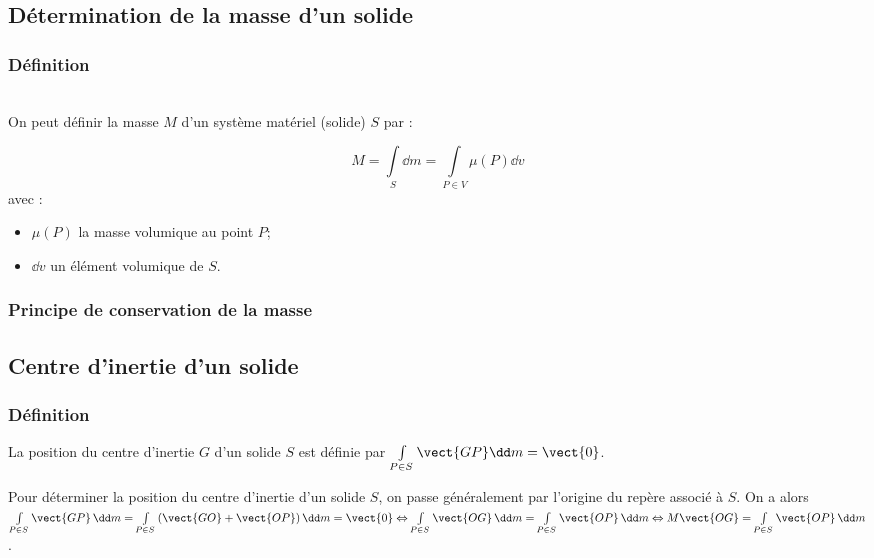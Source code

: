 \subsection{Détermination de la masse d'un solide}
\subsubsection{Définition}
\begin{defi}~\\
%
On peut définir la masse $M$ d'un système matériel (solide) $S$ par : 
\begin{multicols}{2}
\vspace{-1cm}
$$ M = \int\limits_S \dd m =\int\limits_{P\in V} \mu(P) \dd v $$ 
avec :
\begin{itemize}
\item $\mu(P)$ la masse volumique au point $P$;
\item $\dd v$ un élément volumique de $S$.
\end{itemize}
\end{multicols}
\vspace{.01cm}
\end{defi}
\subsubsection{Principe de conservation de la masse}

\subsection{Centre d'inertie d'un solide}
\subsubsection{Définition}

\begin{defi}
La position du centre d'inertie $G$ d'un solide $S$ est définie par $\int\limits_{P\in S} \vect{GP} \dd m = \vect{0}$.
\end{defi}

Pour déterminer la position du centre d'inertie d'un solide $S$, on passe généralement par l'origine du repère associé à $S$. On a alors 
$\int\limits_{P\in S} \vect{GP} \, \dd m=\int\limits_{P\in S} \left(\vect{GO}+\vect{OP}\right) \dd m = \vect{0} 
\Leftrightarrow \int\limits_{P\in S} \vect{OG} \,\dd m =\int\limits_{P\in S} \vect{OP} \,\dd m
\Leftrightarrow  M\vect{OG} =\int\limits_{P\in S} \vect{OP} \,\dd m$.

